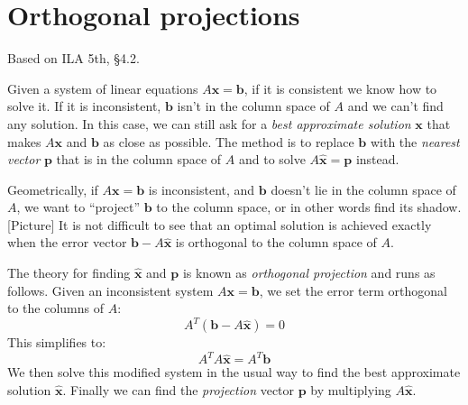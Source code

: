 \documentclass[11pt,oneside]{amsbook}
\theoremstyle{definition}
\theoremstyle{plain}
\theoremstyle{definition}
\theoremstyle{remark}
\numberwithin{equation}{section}
\numberwithin{figure}{section}
\begin{document}
\newpage
\section{Orthogonal projections}

Based on ILA 5th, \S 4.2.

Given a system of linear equations $A\mathbf{x}=\mathbf{b}$, if it is consistent we know how to solve it. If it is inconsistent, $\mathbf{b}$ isn't in the column space of $A$ and we can't find any solution. In this case, we can still ask for a \emph{best approximate solution} $\mathbf{x}$ that makes $A\mathbf{x}$ and $\mathbf{b}$ as close as possible. The method is to replace $\mathbf{b}$ with the \emph{nearest vector} $\mathbf{p}$ that is in the column space of $A$ and to solve $A\hat{\mathbf{x}}=\mathbf{p}$ instead.

Geometrically, if $A\mathbf{x}=\mathbf{b}$ is inconsistent, and $\mathbf{b}$ doesn't lie in the column space of $A$, we want to ``project'' $\mathbf{b}$ to the column space, or in other words find its shadow. [Picture] It is not difficult to see that an optimal solution is achieved exactly when the error vector $\mathbf{b}-A\hat{\mathbf{x}}$ is orthogonal to the column space of $A$.

The theory for finding $\hat{\mathbf{x}}$ and $\mathbf{p}$ is known as \emph{orthogonal projection} and runs as follows. Given an inconsistent system $A\mathbf{x}=\mathbf{b}$, we set the error term orthogonal to the columns of $A$:
\[A^T(\mathbf{b}-A\hat{\mathbf{x}})=0
\]
This simplifies to:
\[A^TA\hat{\mathbf{x}}=A^T\mathbf{b}
\]
We then solve this modified system in the usual way to find the best approximate solution $\hat{\mathbf{x}}$. Finally we can find the \emph{projection} vector $\mathbf{p}$ by multiplying $A\hat{\mathbf{x}}$.
\end{document}
